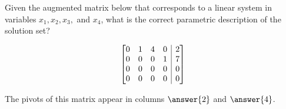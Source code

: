 \documentclass{ximera}
\makeatletter
\newenvironment{amatrix}[1]{%
	\left[\begin{array}{@{}*{#1}{c}|c@{}}
	}{%
\end{array}\right]
}
\makeatother
\begin{document}
  	
  	\begin{question}
  	Given the augmented matrix below that corresponds to a linear system in variables $x_1,x_2,x_3,$ and $x_4$, what is the correct parametric description of the solution set?
  		
  	$$\begin{amatrix}{4}
  	0&1&4&0&2\\
  	0&0&0&1&7\\
  	0&0&0&0&0\\
  	0&0&0&0&0
  	\end{amatrix}$$
  		
  		
  		\begin{multipleChoice}
  		\end{multipleChoice}
The pivots of this matrix appear in columns $\answer{2}$ and $\answer{4}$.  
  		
  	\end{question}
  	
  
  
\end{document}
